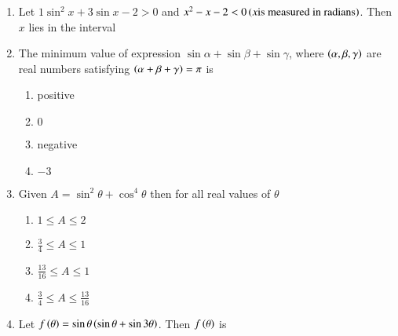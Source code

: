 
\begin{enumerate}[label=\thesubsection.\arabic*,ref=\thesubsection.\theenumi]
\item Let $1\sin^2x+3\sin x-2>0$ and $x^2-x-2<0 \left(x \text{is measured in radians}\right)$. Then $x$ lies in the interval
\hfill{}
\begin{enumerate}
\end{enumerate}
\item The minimum value of expression $\sin{\alpha} + \sin{\beta} + \sin{\gamma}$, where $\left(\alpha,\beta,\gamma\right)$ are real numbers satisfying $\left(\alpha+\beta+\gamma\right)=\pi$  is \hfill{}
\begin{enumerate}
    \item positive
    \item $0$
    \item negative 
    \item $-3$
\end{enumerate}
  

	\item Given $A = \sin^{2}\theta + \cos^{4}\theta $ then for all real values of $\theta$ 
		\hfill{}
  
		\begin{enumerate}
				\item $1 \le A \le2$
  				\item $\frac{3}{4} \le A\le 1$ 
				\item $\frac{13}{16} \le A\le 1$
				\item $\frac{3}{4} \le A\le \frac{13}{16}$ 
		\end{enumerate}

    \item Let $f\left(\theta\right) = \sin{\theta}\left(\sin{\theta} + \sin{3\theta}\right)$. Then $f\left(\theta\right)$ is
        

\end{enumerate}
